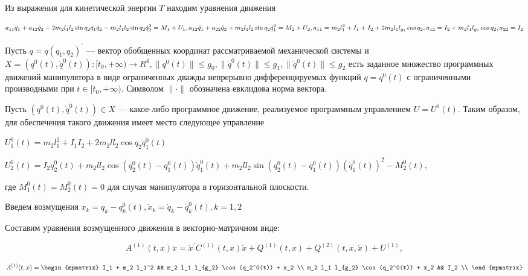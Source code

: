 Из выражения для кинетической энергии $T$ находим уравнения движения

\begin{equation}
a_{11} \ddot q_1 + a_{12} \ddot q_2 - 2 m_2 l_1 l_2 \sin q_2 \dot q_1 \dot q_2 - m_2 l_1 l_2 \sin q_2 \dot q_2^2 = M_1 + U_1, \\ a_{12} \ddot q_1 + a_{22} \ddot q_2 + m_2 l_1 l_2 \sin q_2 \dot q_1^2 = M_2 + U_2, \\ a_{11} = m_2 l_1^2 + I_1 + I_2 + 2 m_2 l_1 l_{g_2} \cos q_2, \\ a_{12} = I_2 + m_2 l_1 l_{g_2} \cos q_2, a_{22} = I_2
\end{equation}

Пусть $q=q(q_1, q_2)^{'}$ --– вектор обобщенных координат рассматриваемой механической системы и $X= {(q^0(t), \dot q^0(t)) : [t_0, + \infty) \to R^4, \|q^0(t)\| \le g_0, \|\dot q^0(t) \| \le g_1, \|\ddot q^0(t)\| \le g_2}$ есть заданное множество программных движений манипулятора в виде ограниченных дважды непрерывно дифференцируемых функций $q=q^0(t)$ с ограниченными производными при $t \in [t_0, + \infty).$ Символом $\| \cdot \|$   обозначена евклидова норма вектора.

Пусть $(q^0(t), \dot q^0(t)) \in X$ --- какое-либо программное движение, реализуемое программным управлением $U = U^0(t).$ Таким образом, для обеспечения такого движения имеет место следующее управление

$U_1^0 (t) = m_2 l_1^2 + I_1 I_2 + 2 m_2 l l_2 \cos q_2 \ddot q_1^0 (t)$

$U_2^0 (t) = I_2 \ddot q_2^0 (t) + m_2 l l_2 \cos (q_2^0 (t) - q_1^0 (t)) \dot q_1^0 (t) + m_2 l l_2 \sin(q_2^0 (t) - q_1^0 (t)) (\dot q_1^0 (t))^2 - M_2^0(t),$

где $M_1^0(t) = M_2^0(t) = 0$ для случая манипулятора в горизонтальной плоскости.

Введем возмущения $x_k = q_k - q_k^0(t), \dot x_k = \dot q_k - \dot q_k^0(t), k = 1, 2$

Составим уравнения возмущенного движения в векторно-матричном виде:

\begin{equation}
A^{(1)}(t, x) \ddot x = {\dot x^{'} C^{(1)}(t, x) \dot x} + Q^{(1)}(t,x) + Q^{(2)}(t, x, \dot x) + U^{(1)}, \label{2.2'}
\end{equation}

$$A^{(1)}(t, x) =
\begin{mpmatrix}
I_1 + m_2 l_1^2 && m_2 l_1 l_{g_2} \cos(q_2^0(t)) + x_2 \\
m_2 l_1 l_{g_2} \cos(q_2^0(t)) + x_2  && I_2 \\
\end{mpmatrix}$$

